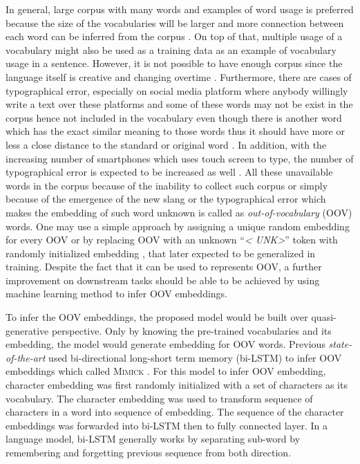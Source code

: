     In general, large corpus with many words and examples of word
    usage is preferred because the size of the vocabularies will be
    larger and more connection between each word can be inferred from
    the corpus \citep{size2018kutuzov}. On top of that, multiple usage
    of a vocabulary might also be used as a training data as an example
    of vocabulary usage in a sentence. However, it is not possible to
    have enough corpus since the language itself is creative and
    changing overtime \citep{forrester2008abrief,
    speech2009Jurafsky:2009:SLP:1214993}. Furthermore, there are cases
    of typographical error, especially on social media platform where
    anybody willingly write a text over these platforms
    \citep{Liu2010SentimentAA} and some of these words may not be
    exist in the corpus hence not included in the vocabulary even
    though there is another word which has the exact similar meaning to
    those words thus it should have more or less a close distance to the
    standard or original word \citep{mapping2012eisenstein}. In
    addition, with the increasing number of smartphones which uses
    touch screen to type, the number of typographical error is
    expected to be increased as well \citep{ghosh2017correction}. All
    these unavailable words in the corpus because of the inability to
    collect such corpus or simply because of the emergence of the new slang or
    the typographical error which makes the embedding of such word unknown
    is called as \textit{out-of-vocabulary} (OOV) words. One
    may use a simple approach by assigning a unique random embedding for
    every OOV or by replacing OOV with an unknown ``\textit{\textless
    UNK\textgreater}'' token with randomly initialized embedding
    \citep{predicting2019garneau}, that later expected to be generalized
    in training. Despite the fact that it can be used to represents
    OOV, a further improvement on downstream tasks should be able to be
    achieved by using machine learning method to infer OOV embeddings.

    To infer the OOV embeddings, the proposed model would be built
    over quasi-generative perspective. Only by knowing the pre-trained
    vocabularies and its embedding, the model would generate embedding
    for OOV words. Previous \textit{state-of-the-art} used
    bi-directional long-short term memory (bi-LSTM) to infer OOV
    embeddings which called \textsc{Mimick} \citep{mimicking2017Pinter}. For
    this model to infer OOV embedding, character embedding was first
    randomly initialized with a set of characters as its vocabulary.
    The character embedding was used to transform sequence of
    characters in a word into sequence of embedding. The sequence of
    the character embeddings was forwarded into bi-LSTM then to fully
    connected layer. In a language model, bi-LSTM generally works by
    separating sub-word by remembering and forgetting previous
    sequence from both direction. 
    
